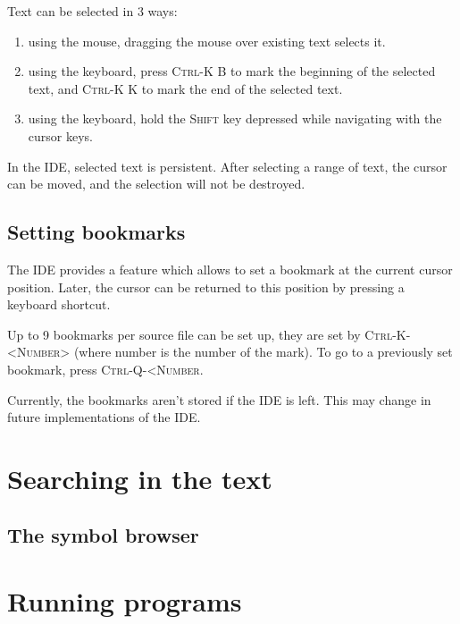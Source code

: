 Text can be selected in 3 ways:
\begin{enumerate}
\item using the mouse, dragging the mouse over existing text selects it.
\item using the keyboard, press \textsc{Ctrl-K B} to mark the beginning of
the selected text, and \textsc{Ctrl-K K} to mark the end of the selected
text.
\item using the keyboard, hold the \textsc{Shift} key depressed while
navigating with the cursor keys.
\end{enumerate}

In the \fpc IDE, selected text is persistent. After selecting a range of 
text, the cursor can be moved, and the selection will not be destroyed.
 


%
%
\subsection{Setting bookmarks}
\label{se:bookmarks}
The IDE provides a feature which allows to set a bookmark at the current 
cursor position. Later, the cursor can be returned to this position 
by pressing a keyboard shortcut.

Up to 9 bookmarks per source file can be set up, they are set by
\textsc{Ctrl-K-<Number>} (where number is the number of the mark).
To go to a previously set bookmark, press \textsc{Ctrl-Q-<Number}.

\begin{remark}
Currently, the bookmarks aren't stored if the IDE is left. This may
change in future implementations of the IDE.
\end{remark}

\section{Searching in the text}
\label{se:searching}


\subsection{The symbol browser}

\section{Running programs}
\label{se:running}

